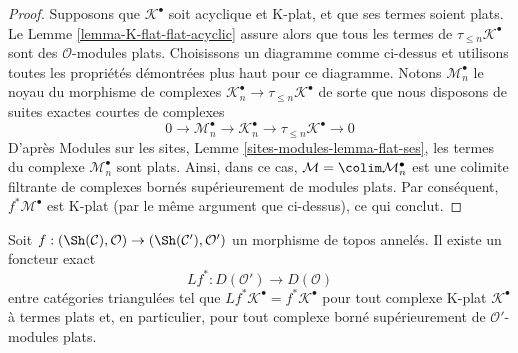 \begin{proof}
\medskip\noindent
Supposons que $\mathcal{K}^\bullet$ soit acyclique et K-plat, et que ses
termes soient plats. Le Lemme \ref{lemma-K-flat-flat-acyclic} assure alors
que tous les termes de $\tau_{\leq n}\mathcal{K}^\bullet$ sont des
$\mathcal{O}$-modules plats. Choisissons un diagramme comme ci-dessus et
utilisons toutes les propriétés démontrées plus haut pour ce diagramme.
Notons $\mathcal{M}_n^\bullet$ le noyau du morphisme de complexes
$\mathcal{K}_n^\bullet \to \tau_{\leq n}\mathcal{K}^\bullet$
de sorte que nous disposons de suites exactes courtes de complexes
$$
0 \to \mathcal{M}_n^\bullet \to \mathcal{K}_n^\bullet \to
\tau_{\leq n}\mathcal{K}^\bullet \to 0
$$
D'après Modules sur les sites, Lemme \ref{sites-modules-lemma-flat-ses},
les termes du complexe $\mathcal{M}_n^\bullet$ sont plats. Ainsi, dans ce
cas, $\mathcal{M} = \colim \mathcal{M}_n^\bullet$ est une colimite filtrante
de complexes bornés supérieurement de modules plats. Par conséquent,
$f^*\mathcal{M}^\bullet$ est K-plat (par le même argument que ci-dessus),
ce qui conclut.
\end{proof}

\begin{lemma}
\label{lemma-derived-base-change}
Soit $f : (\Sh(\mathcal{C}), \mathcal{O}) \to (\Sh(\mathcal{C}'), \mathcal{O}')$
un morphisme de topos annelés. Il existe un foncteur exact
$$
Lf^* : D(\mathcal{O}') \longrightarrow D(\mathcal{O})
$$
entre catégories triangulées tel que
$Lf^*\mathcal{K}^\bullet = f^*\mathcal{K}^\bullet$ pour tout complexe
K-plat $\mathcal{K}^\bullet$ à termes plats et, en particulier, pour tout
complexe borné supérieurement de $\mathcal{O}'$-modules plats.
\end{lemma}

